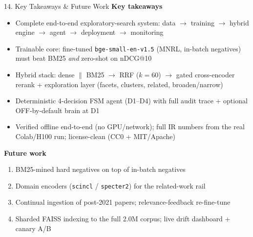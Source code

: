 \documentclass[10pt,aspectratio=169]{beamer}
\begin{document}
\begin{frame}{14. Key Takeaways \& Future Work}
\textbf{Key takeaways}
\begin{itemize}\small
  \item Complete end-to-end exploratory-search system: data $\rightarrow$ training $\rightarrow$ hybrid engine $\rightarrow$ agent $\rightarrow$ deployment $\rightarrow$ monitoring
  \item Trainable core: fine-tuned \texttt{bge-small-en-v1.5} (MNRL, in-batch negatives) must beat BM25 \emph{and} zero-shot on nDCG@10
  \item Hybrid stack: dense $\parallel$ BM25 $\rightarrow$ RRF ($k=60$) $\rightarrow$ gated cross-encoder rerank + exploration layer (facets, clusters, related, broaden/narrow)
  \item Deterministic 4-decision FSM agent (D1--D4) with full audit trace + optional OFF-by-default brain at D1
  \item Verified offline end-to-end (no GPU/network); full IR numbers from the real Colab/H100 run; license-clean (CC0 + MIT/Apache)
\end{itemize}

\textbf{Future work}
\begin{enumerate}\small
  \item BM25-mined hard negatives on top of in-batch negatives
  \item Domain encoders (\texttt{scincl} / \texttt{specter2}) for the related-work rail
  \item Continual ingestion of post-2021 papers; relevance-feedback re-fine-tune
  \item Sharded FAISS indexing to the full 2.0M corpus; live drift dashboard + canary A/B
\end{enumerate}
\end{frame}
\end{document}

